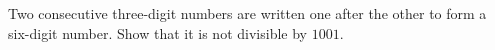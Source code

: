 Two consecutive three-digit numbers are written one after the other to form a six-digit number. Show that it is not divisible by $1001$.
